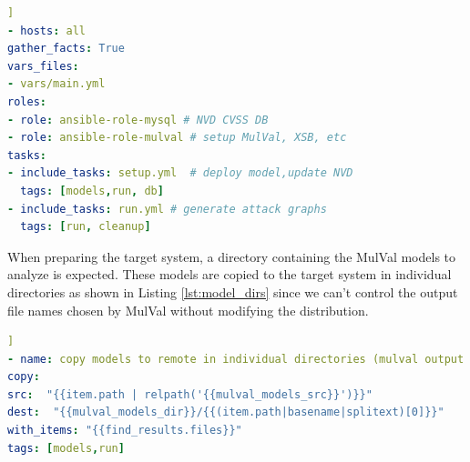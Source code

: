 
\begin{lstlisting}[language=yaml, label={lst:playbook}, caption={Ansible play},captionpos=b,]]
- hosts: all
gather_facts: True
vars_files:
- vars/main.yml
roles:
- role: ansible-role-mysql # NVD CVSS DB
- role: ansible-role-mulval # setup MulVal, XSB, etc
tasks:
- include_tasks: setup.yml  # deploy model,update NVD
  tags: [models,run, db]
- include_tasks: run.yml # generate attack graphs
  tags: [run, cleanup]
\end{lstlisting}


When preparing the target system, a directory containing the MulVal models to analyze is expected. These models are copied to the target system in individual directories as shown in Listing \ref{lst:model_dirs} since we can't control the output file names chosen by MulVal without modifying the distribution. 

\begin{minipage}{.95\linewidth}
\begin{lstlisting}[language=yaml, label={lst:model_dirs}, caption={MulVal distinct run dirs},captionpos=b,  ]]
- name: copy models to remote in individual directories (mulval output is noisy)
copy:
src:  "{{item.path | relpath('{{mulval_models_src}}')}}"
dest:  "{{mulval_models_dir}}/{{(item.path|basename|splitext)[0]}}"
with_items: "{{find_results.files}}"
tags: [models,run]
\end{lstlisting}
\end{minipage}

